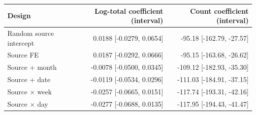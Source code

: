 \begin{tabular}{lrr}
\toprule
Design & Log-total coefficient (interval) & Count coefficient (interval) \\
\midrule
Random source intercept & 0.0188 [-0.0279, 0.0654] & -95.18 [-162.79, -27.57] \\
Source FE & 0.0187 [-0.0292, 0.0666] & -95.15 [-163.68, -26.62] \\
Source + month & -0.0078 [-0.0500, 0.0345] & -109.12 [-182.93, -35.30] \\
Source + date & -0.0119 [-0.0534, 0.0296] & -111.03 [-184.91, -37.15] \\
Source $\times$ week & -0.0257 [-0.0665, 0.0151] & -117.74 [-193.31, -42.16] \\
Source $\times$ day & -0.0277 [-0.0688, 0.0135] & -117.95 [-194.43, -41.47] \\
\bottomrule
\end{tabular}
